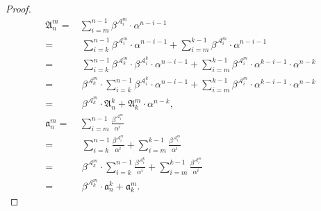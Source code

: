 \begin{proof}
\begin{align*}
    \mathfrak{A}_n^{m} =&\sum_{i = m}^{n - 1}\beta^{\mathcal{A}_i^{m}}\cdot\alpha^{n-i-1} \\
    =&\ \sum_{i = k}^{n - 1}\beta^{\mathcal{A}_i^{m}}\cdot\alpha^{n-i-1} + \sum_{i = m}^{k - 1}\beta^{\mathcal{A}_i^{m}}\cdot\alpha^{n-i-1} \\
    =&\ \sum_{i = k}^{n - 1}\beta^{\mathcal{A}_k^{m}}\cdot\beta^{\mathcal{A}_i^{k}}\cdot\alpha^{n-i-1} + \sum_{i = m}^{k - 1}\beta^{\mathcal{A}_i^{m}}\cdot\alpha^{k-i-1}\cdot\alpha^{n-k} \\
    =&\ \beta^{\mathcal{A}_k^{m}}\cdot\sum_{i = k}^{n - 1}\beta^{\mathcal{A}_i^{k}}\cdot\alpha^{n-i-1} + \sum_{i = m}^{k - 1}\beta^{\mathcal{A}_i^{m}}\cdot\alpha^{k-i-1}\cdot\alpha^{n-k} \\
    =&\ \beta^{\mathcal{A}_k^{m}}\cdot\mathfrak{A}_n^{k} + \mathfrak{A}_k^m\cdot\alpha^{n-k}, \\
    \mathfrak{a}_n^{m} =&\sum_{i = m}^{n - 1}\frac{\beta^{\mathcal{A}_i^{m}}}{\alpha^{i}} \\
    =&\ \sum_{i = k}^{n - 1}\frac{\beta^{\mathcal{A}_i^{m}}}{\alpha^{i}} + \sum_{i = m}^{k - 1}\frac{\beta^{\mathcal{A}_i^{m}}}{\alpha^{i}} \\
    =&\ \beta^{\mathcal{A}_k^{m}}\cdot\sum_{i = k}^{n - 1}\frac{\beta^{\mathcal{A}_i^{k}}}{\alpha^{i}} + \sum_{i = m}^{k - 1}\frac{\beta^{\mathcal{A}_i^{m}}}{\alpha^{i}} \\
    =&\ \beta^{\mathcal{A}_k^{m}}\cdot\mathfrak{a}_n^k + \mathfrak{a}_k^m.
\end{align*}
\end{proof}

